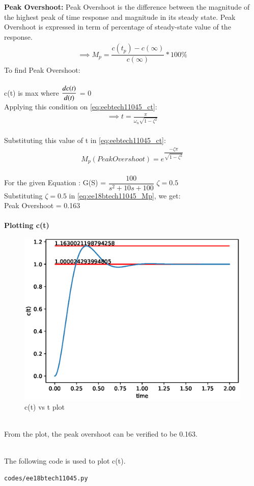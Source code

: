 \begin{enumerate}[label=\thesubsection.\arabic*.,ref=\thesubsection.\theenumi]
 \textbf{Peak Overshoot:}
 Peak Overshoot is the difference between the magnitude of the highest peak of time response and magnitude in its steady state. Peak Overshoot is expressed in term of percentage of steady-state value of the response.
\begin{align}
\implies M_p = \dfrac{c(t_p) - c(\infty)}{c(\infty)} * 100 \%
\end{align}
To find Peak Overshoot:
\\
\\
c(t) is max where $\dfrac{dc(\emph{t})}{d(\emph{t})}$ = 0
\\
Applying this condition on \eqref{eq:eebtech11045_ct}:
\begin{align}
    \implies t = \frac{\pi}{\omega_n\sqrt{1-\zeta^2}}
\end{align}
\\Substituting this value of t in \eqref{eq:eebtech11045_ct}:
\begin{align}
    M_p (PeakOvershoot) = e^{\dfrac{-\zeta\pi}{\sqrt{1-\zeta^2}}}
    \label{eq:ee18btech11045_Mp}
\end{align}
\\
For the given Equation : G(S) = $\dfrac{100}{s^2 + 10s +100}$
$\zeta = 0.5$
\\
Substituting $\zeta = 0.5$ in \eqref{eq:ee18btech11045_Mp}, we get:
\\
Peak Overshoot = 0.163
\\
\\
\textbf{Plotting c(t)}
\begin{figure}[!h]
    \centering
    \includegraphics[width=\columnwidth]{./figs/ee18btech11045/ee18btech11045.eps}
    \caption{c(t) vs t plot}
    \label{fig:ee18btech11045_plot} 
\end{figure}
\\From the plot, the peak overshoot can be verified to be 0.163.

\\The following code is used to plot c(t).
\begin{lstlisting}
codes/ee18btech11045.py
\end{lstlisting}
\end{enumerate}